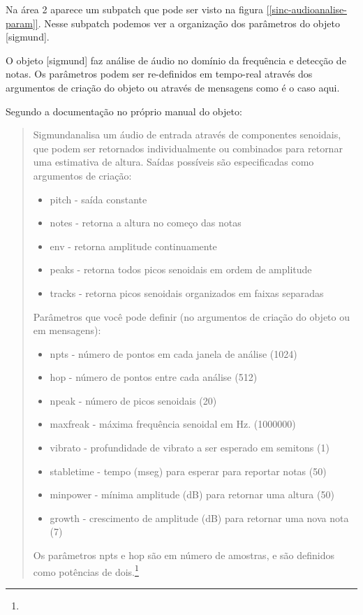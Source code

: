 \documentclass[draft]{ppgmus}
\begin{document}
Na área 2 aparece um subpatch que pode ser visto na figura
\ref{[sinc-audioanalise-param]}. Nesse subpatch podemos ver 
a organização dos parâmetros do objeto [sigmund\texttildelow].

O objeto [sigmund\texttildelow] faz análise de áudio no domínio da 
frequência e detecção de notas. Os parâmetros podem ser re-definidos
em tempo-real através dos argumentos de criação do objeto ou através
de mensagens como é o caso aqui.


Segundo a documentação no próprio manual do objeto:
\begin{quote}
 Sigmund\texttildelow analisa um áudio de entrada através de componentes senoidais,
que podem ser retornados individualmente ou combinados para
retornar uma estimativa de altura. Saídas possíveis são especificadas
como argumentos de criação:

\begin{itemize}
 \item pitch - saída constante
 \item notes - retorna a altura no começo das notas 
 \item env - retorna amplitude continuamente
 \item peaks - retorna todos picos senoidais em ordem de amplitude
 \item tracks - retorna picos senoidais organizados em faixas separadas
\end{itemize}

Parâmetros que você pode definir (no argumentos de criação do objeto ou em mensagens):

\begin{itemize}
 \item npts - número de pontos em cada janela de análise (1024)
 \item hop - número de pontos entre cada análise (512)
 \item npeak - número de picos senoidais (20)
 \item maxfreak - máxima frequência senoidal em Hz. (1000000)
 \item vibrato - profundidade de vibrato a ser esperado em semitons (1)
 \item stabletime - tempo (mseg) para esperar para reportar notas (50)
 \item minpower - mínima amplitude (dB) para retornar uma altura (50)
 \item growth - crescimento de amplitude (dB) para retornar uma nova nota (7) 
\end{itemize}
Os parâmetros npts e hop são em número de amostras, e são definidos como potências de dois.\footnote{

}
\end{quote}
\end{document}
